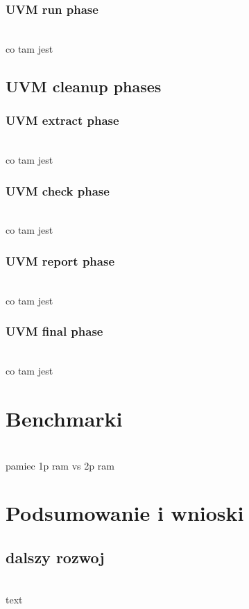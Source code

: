 \documentclass[11pt,a4paper]{article}
\begin{document}
		\subsubsection{UVM run phase}
		\hspace{5mm}
			\\co tam jest	

	\subsection{UVM cleanup phases}

		\subsubsection{UVM extract phase}
		\hspace{5mm}
			\\co tam jest	
			
		\subsubsection{UVM check phase}
		\hspace{5mm}
			\\co tam jest	
			
		\subsubsection{UVM report phase}
		\hspace{5mm}
			\\co tam jest	
			
		\subsubsection{UVM final phase}
		\hspace{5mm}
			\\co tam jest	

\newpage
\section{Benchmarki}
\hspace{5mm}
	\\ pamiec 1p ram vs 2p ram

\newpage
\section{Podsumowanie i wnioski}
	\subsection{dalszy rozwoj}
	\hspace{5mm}
		\\text
\end{document}
